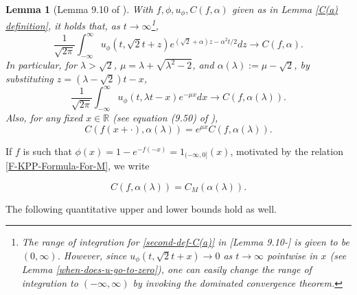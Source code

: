 \documentclass[a4paper,reqno]{amsart}%
\newcommand{\1}{\mathbf 1}
\theoremstyle{mine}
\numberwithin{theorem}{section}
\newtheorem{lemma}[theorem]{Lemma}
\numberwithin{equation}{section}
\theoremstyle{remark}
\begin{document}
\begin{lemma}[Lemma 9.10 of \cite{Bovier_book}] \label{C(a)-def-2}
With $f, \phi, u_\phi,  C(f, \alpha)$ given as in Lemma \ref{C(a) definition}, it holds that, as $t\to \infty$\footnote{The range of integration for \eqref{second-def-C(a)} in [Lemma 9.10-\cite{Bovier_book}] is given to be $(0,\infty)$. However, since $u_{\phi}(t, \sqrt{2}t + x) \to 0$ as $t\to \infty$ pointwise in $x$ (see Lemma \ref{when-does-u-go-to-zero}), one can easily change the range of integration to $(-\infty, \infty)$ by invoking the dominated convergence theorem.},
\begin{equation}\label{second-def-C(a)}
\frac{1}{\sqrt{2\pi}} \int_{-\infty}^\infty u_\phi(t, \sqrt{2}t + z) e^{(\sqrt{2}+ \alpha)z - \alpha^2t /2} dz \to C(f, \alpha).     
\end{equation}
In particular, for $\lambda >\sqrt{2}$, $\mu =\lambda + \sqrt{\lambda^2-2}$, and $\alpha(\lambda) := \mu -\sqrt{2}$, by substituting $ z = (\lambda -\sqrt{2})t - x$, 
\begin{equation}\label{C(a)-specific-to-lambda}
    \frac{1}{\sqrt{2\pi}} \int_{-\infty}^{\infty} u_{\phi}(t, \lambda t -x)e^{-\mu x} dx \to C(f, \alpha(\lambda)). 
\end{equation}
Also, for any fixed $x \in \mathbb{R}$ (see equation (9.50) of \cite{Bovier_book}), 
\begin{equation}\label{shift-relation-for-C(a)}
    C(f(x + \cdot), \alpha(\lambda)) = e^{\mu x}C(f, \alpha(\lambda)).
\end{equation}


    
\end{lemma}

If $f$ is such that $\phi (x) = 1-e^{-f(-x)} =  1_{(-\infty, 0]}(x)$, motivated by the relation \eqref{F-KPP-Formula-For-M}, we write

\begin{equation} \label{rename-C(f)-for-M-for-supercritical}
    C(f, \alpha(\lambda)) = C_M(\alpha(\lambda)).
\end{equation}


The following quantitative upper and lower bounds hold as well.  
\end{document}
